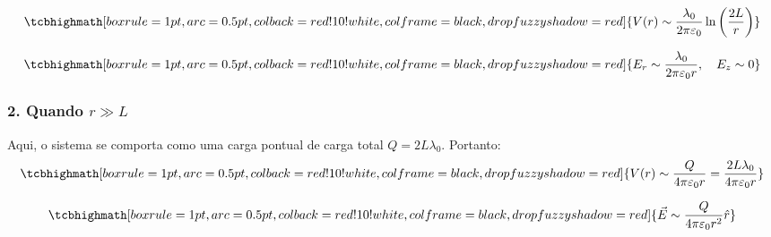 \documentclass[a4paper,12pt]{article}
\begin{document}
\begin{equation}
    \tcbhighmath[boxrule=1pt,arc=0.5pt,colback=red!10!white,colframe=black,
      drop fuzzy shadow=red]{
V(r) \sim \frac{\lambda_0}{2\pi\varepsilon_0} \ln\left(\frac{2L}{r}\right)
}
\end{equation}

\begin{equation}
    \tcbhighmath[boxrule=1pt,arc=0.5pt,colback=red!10!white,colframe=black,
      drop fuzzy shadow=red]{
E_r \sim \frac{\lambda_0}{2\pi\varepsilon_0 r}, \quad E_z \sim 0
}
\end{equation}

\subsubsection*{2. Quando \( r \gg L \)}

Aqui, o sistema se comporta como uma carga pontual de carga total \( Q = 2L\lambda_0 \). Portanto:
\begin{equation}
    \tcbhighmath[boxrule=1pt,arc=0.5pt,colback=red!10!white,colframe=black,
      drop fuzzy shadow=red]{
V(r) \sim \frac{Q}{4\pi\varepsilon_0 r} = \frac{2L\lambda_0}{4\pi\varepsilon_0 r}
}
\end{equation}

\begin{equation}
    \tcbhighmath[boxrule=1pt,arc=0.5pt,colback=red!10!white,colframe=black,
      drop fuzzy shadow=red]{
\vec{E} \sim \frac{Q}{4\pi\varepsilon_0 r^2} \hat{r}
}
\end{equation}
\end{document}
